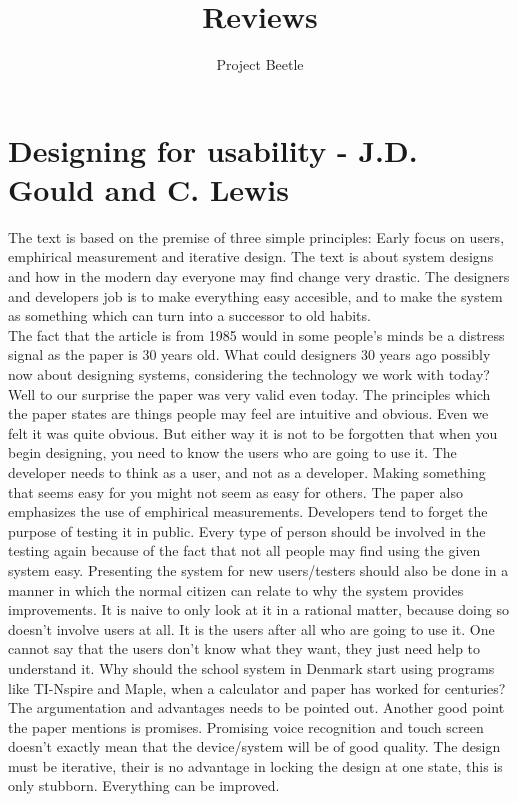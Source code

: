 \documentclass[a4paper]{article}
\title{Reviews}
\author{Project Beetle}
\begin{document}
\maketitle
\section{Designing for usability - J.D. Gould and C. Lewis}
The text is based on the premise of  three simple principles: Early focus on users, emphirical measurement and iterative design. The text is about system designs and how in the modern day everyone may find change very drastic. The designers and developers job is to make everything easy accesible, and to make the system as something which can turn into a successor to old habits. \\
The fact that the article is from 1985 would in some people's minds be a distress signal as the paper is 30 years old. What could designers 30 years ago possibly now about designing systems, considering the technology we work with today? Well to our surprise the paper was very valid even today. The principles which the paper states are things people may feel are intuitive and obvious. Even we felt it was quite obvious. But either way it is not to be forgotten that when you begin designing, you need to know the users who are going to use it. The developer needs to think as a user, and not as a developer. Making something that seems easy for you might not seem as easy for others. The paper also emphasizes the use of emphirical measurements. Developers tend to forget the purpose of testing it in public. Every type of person should be involved in the testing again because of the fact that not all people may find using the given system easy. Presenting the system for new users/testers should also be done in a manner in which the normal citizen can relate to why the system provides improvements. It is naive to only look at it in a rational matter, because doing so doesn't involve users at all. It is the users after all who are going to use it. One cannot say that the users don't know what they want, they just need help to understand it. Why should the school system in Denmark start using programs like TI-Nspire and Maple, when a calculator and paper has worked for centuries? The argumentation and advantages needs to be pointed out. Another good point the paper mentions is promises. Promising voice recognition and touch screen doesn't exactly mean that the device/system will be of good quality. The design must be iterative, their is no advantage in locking the design at one state, this is only stubborn. Everything can be improved.
\end{document}
